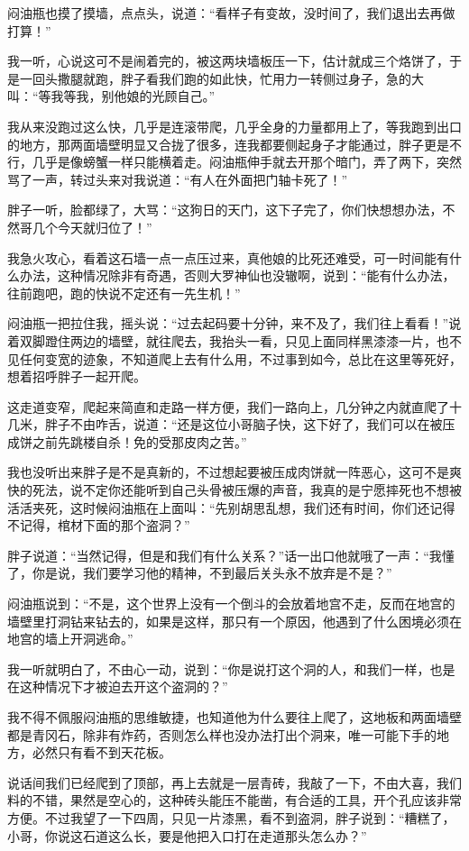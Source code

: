 闷油瓶也摸了摸墙，点点头，说道：“看样子有变故，没时间了，我们退出去再做打算！”

我一听，心说这可不是闹着完的，被这两块墙板压一下，估计就成三个烙饼了，于是一回头撒腿就跑，胖子看我们跑的如此快，忙用力一转侧过身子，急的大叫：“等我等我，别他娘的光顾自己。”

我从来没跑过这么快，几乎是连滚带爬，几乎全身的力量都用上了，等我跑到出口的地方，那两面墙壁明显又合拢了很多，连我都要侧起身子才能通过，胖子更是不行，几乎是像螃蟹一样只能横着走。闷油瓶伸手就去开那个暗门，弄了两下，突然骂了一声，转过头来对我说道：“有人在外面把门轴卡死了！”

胖子一听，脸都绿了，大骂：“这狗日的天门，这下子完了，你们快想想办法，不然哥几个今天就归位了！”

我急火攻心，看着这石墙一点一点压过来，真他娘的比死还难受，可一时间能有什么办法，这种情况除非有奇遇，否则大罗神仙也没辙啊，说到：“能有什么办法，往前跑吧，跑的快说不定还有一先生机！”

闷油瓶一把拉住我，摇头说：“过去起码要十分钟，来不及了，我们往上看看！”说着双脚蹬住两边的墙壁，就往爬去，我抬头一看，只见上面同样黑漆漆一片，也不见任何变宽的迹象，不知道爬上去有什么用，不过事到如今，总比在这里等死好，想着招呼胖子一起开爬。

这走道变窄，爬起来简直和走路一样方便，我们一路向上，几分钟之内就直爬了十几米，胖子不由咋舌，说道：“还是这位小哥脑子快，这下好了，我们可以在被压成饼之前先跳楼自杀！免的受那皮肉之苦。”

我也没听出来胖子是不是真新的，不过想起要被压成肉饼就一阵恶心，这可不是爽快的死法，说不定你还能听到自己头骨被压爆的声音，我真的是宁愿摔死也不想被活活夹死，这时候闷油瓶在上面叫：“先别胡思乱想，我们还有时间，你们还记得不记得，棺材下面的那个盗洞？”

胖子说道：“当然记得，但是和我们有什么关系？”话一出口他就哦了一声：“我懂了，你是说，我们要学习他的精神，不到最后关头永不放弃是不是？”

闷油瓶说到：“不是，这个世界上没有一个倒斗的会放着地宫不走，反而在地宫的墙壁里打洞钻来钻去的，如果是这样，那只有一个原因，他遇到了什么困境必须在地宫的墙上开洞逃命。”

我一听就明白了，不由心一动，说到：“你是说打这个洞的人，和我们一样，也是在这种情况下才被迫去开这个盗洞的？”

我不得不佩服闷油瓶的思维敏捷，也知道他为什么要往上爬了，这地板和两面墙壁都是青冈石，除非有炸药，否则怎么样也没办法打出个洞来，唯一可能下手的地方，必然只有看不到天花板。

说话间我们已经爬到了顶部，再上去就是一层青砖，我敲了一下，不由大喜，我们料的不错，果然是空心的，这种砖头能压不能凿，有合适的工具，开个孔应该非常方便。不过我望了一下四周，只见一片漆黑，看不到盗洞，胖子说到：“糟糕了，小哥，你说这石道这么长，要是他把入口打在走道那头怎么办？”

